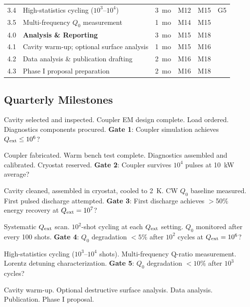 \documentclass[11pt]{article}
\newcommand{\Qext}{Q_{\rm ext}}
\newcommand{\Qzero}{Q_0}
\begin{document}
\begin{center}
\begin{tabular}{clcccl}
3.4 & High-statistics cycling ($10^3$--$10^4$) & 3~mo & M12 & M15 & G5 \\
3.5 & Multi-frequency $\Qzero$ measurement & 1~mo & M14 & M15 & \\
\midrule
4.0 & \textbf{Analysis \& Reporting} & 3~mo & M15 & M18 & \\
4.1 & Cavity warm-up; optional surface analysis & 1~mo & M15 & M16 & \\
4.2 & Data analysis \& publication drafting & 2~mo & M16 & M18 & \\
4.3 & Phase I proposal preparation & 2~mo & M16 & M18 & \\
\bottomrule
\end{tabular}
\end{center}

\subsection{Quarterly Milestones}

\begin{description}[style=nextline,leftmargin=2cm]
  \item[Q1 (M0--M3)] Cavity selected and inspected. Coupler EM
    design complete. Load ordered. Diagnostics components procured.
    \textbf{Gate 1}: Coupler simulation achieves $\Qext \leq 10^6$?
  \item[Q2 (M3--M6)] Coupler fabricated. Warm bench test complete.
    Diagnostics assembled and calibrated. Cryostat reserved.
    \textbf{Gate 2}: Coupler survives $10^4$ pulses at 10~kW average?
  \item[Q3 (M6--M9)] Cavity cleaned, assembled in cryostat, cooled
    to 2~K. CW $\Qzero$ baseline measured. First pulsed discharge
    attempted.
    \textbf{Gate 3}: First discharge achieves $>$50\% energy recovery
    at $\Qext = 10^7$?
  \item[Q4 (M9--M12)] Systematic $\Qext$ scan. $10^2$-shot cycling
    at each $\Qext$ setting. $\Qzero$ monitored after every 100 shots.
    \textbf{Gate 4}: $\Qzero$ degradation $< 5\%$ after $10^2$ cycles
    at $\Qext = 10^6$?
  \item[Q5 (M12--M15)] High-statistics cycling ($10^3$--$10^4$ shots).
    Multi-frequency Q-ratio measurement. Lorentz detuning
    characterization.
    \textbf{Gate 5}: $\Qzero$ degradation $< 10\%$ after $10^3$ cycles?
  \item[Q6 (M15--M18)] Cavity warm-up. Optional destructive surface
    analysis. Data analysis. Publication. Phase I proposal.
\end{description}
\end{document}
